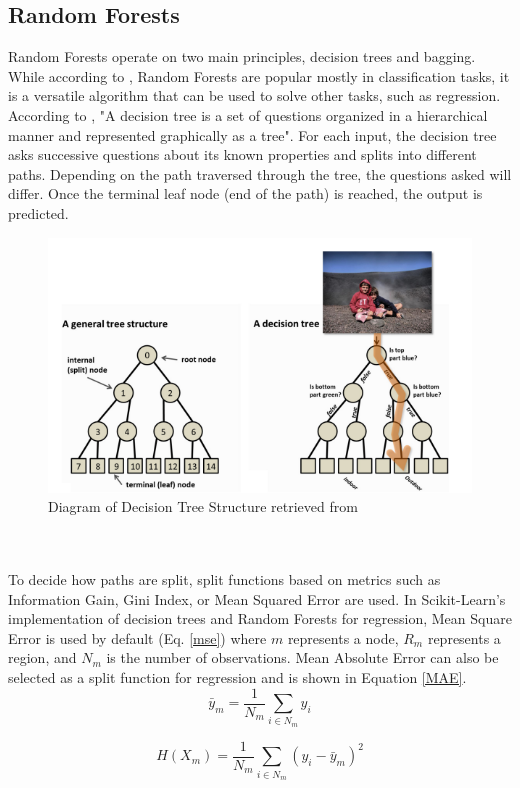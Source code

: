 \subsection{Random Forests}
Random Forests operate on two main principles, decision trees and bagging. While according to \cite{RF}, Random Forests are popular mostly in classification tasks, it is a versatile algorithm that can be used to solve other tasks, such as regression. According to \cite{RF}, "A decision tree is a set of questions organized in a hierarchical manner and represented graphically as a tree". For each input, the decision tree asks successive questions about its known properties and splits into different paths. Depending on the path traversed through the tree, the questions asked will differ. Once the terminal leaf node (end of the path) is reached, the output is predicted.
\begin{figure}[!htb]
    \centering
    \includegraphics[width=0.5\linewidth]{other/decision_tree_RF.png}
    \caption{Diagram of Decision Tree Structure retrieved from \cite{RF}}
\end{figure}
\\\\To decide how paths are split, split functions based on metrics such as Information Gain, Gini Index, or Mean Squared Error are used. In Scikit-Learn's implementation of decision trees and Random Forests for regression, Mean Square Error is used by default (Eq. \ref{mse}) where $m$ represents a node, $R_{m}$ represents a region, and $N_{m}$ is the number of observations. Mean Absolute Error can also be selected as a split function for regression and is shown in Equation \ref{MAE}.
\begin{equation}
\bar{y}_{m} = \frac{1}{N_{m}}\sum_{i\in N_{m}}y_{i}    
\end{equation}

\begin{equation}
\label{mse}
    H(X_{m}) = \frac{1}{N_{m}} \sum_{i \in N_{m}}(y_{i} - \bar{y}_{m})^2
\end{equation}

